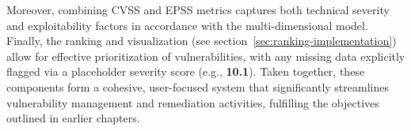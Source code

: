 Moreover, combining \ac{CVSS} and \ac{EPSS} metrics captures both technical severity and exploitability factors in accordance with the multi-dimensional model. Finally, the ranking and visualization (see section~\ref{sec:ranking-implementation}) allow for effective prioritization of vulnerabilities, with any missing data explicitly flagged via a placeholder severity score (e.g., \textbf{10.1}). Taken together, these components form a cohesive, user-focused system that significantly streamlines vulnerability management and remediation activities, fulfilling the objectives outlined in earlier chapters.


